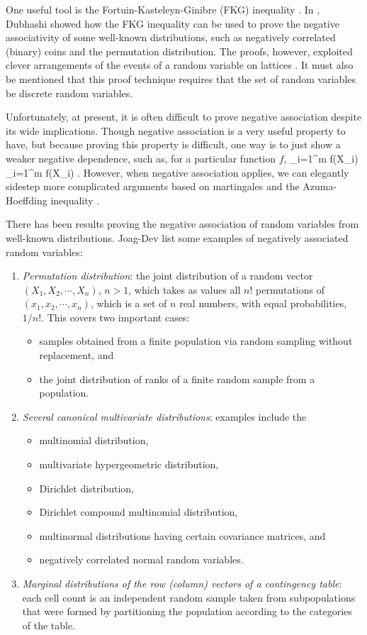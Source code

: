 One useful tool is the Fortuin-Kasteleyn-Ginibre (FKG) inequality \cite{Fortuin71FKG}. In
\cite{Dubhashi96FKGNA}, Dubhashi \etal showed how the FKG inequality can be used to prove
the negative associativity of some well-known distributions, such as negatively correlated
(binary) coins and the permutation distribution. The proofs, however, exploited clever 
arrangements of the events of a random variable on lattices \cite{Dubhashi96FKGNA}.
It must also be mentioned that this proof technique requires that the set of random variables
be discrete random variables.

Unfortunately, at present, it is often difficult to prove negative association despite its wide
implications. Though negative association is a very useful property to have, but because
proving this property is difficult, one way is to just show a weaker negative dependence,
such as, for a particular function $f$,
\ben
\E\left\lbrack \prod_{i=1}^m f(X_i) \right\rbrack 
\le  \prod_{i=1}^m \E\left\lbrack f(X_i) \right\rbrack .
\een
However, when negative association applies, we can elegantly sidestep more complicated
arguments based on martingales and the Azuma-Hoeffding inequality 
\cite{Azuma67Martingale,Hoeffding63Bounded}.

There has been results proving the negative association of random variables from 
well-known distributions.
Joag-Dev \etal \cite{JoagDev83NA} list some examples of negatively associated random variables:
\begin{enumerate}
\item \textit{Permutation distribution}: the joint distribution of a random vector $(X_1,X_2,\cdots,X_n)$,
$n > 1$, which takes as values all $n!$ permutations of $(x_1,x_2,\cdots, x_n)$, which is a set of 
$n$ real numbers, with equal probabilities, \ie $1/n!$. This covers two important cases:
\begin{itemize}
\item samples obtained from a finite population via random sampling without replacement, and
\item the joint distribution of ranks of a finite random sample from a population.
\end{itemize}
\item \textit{Several canonical multivariate distributions}: examples include the
\begin{itemize}
\item multinomial distribution,
\item multivariate hypergeometric distribution,
\item Dirichlet distribution,
\item Dirichlet compound multinomial distribution,
\item multinormal distributions having certain covariance matrices, and
\item negatively correlated normal random variables.
\end{itemize}
\item \textit{Marginal distributions of the row (column) vectors of a contingency table}: 
each cell count is an independent random sample taken from subpopulations that were
formed by partitioning the population according to the categories of the table.
\end{enumerate}

